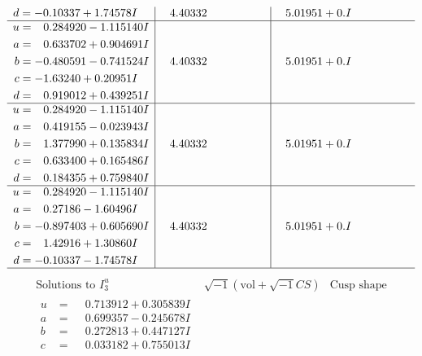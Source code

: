 \documentclass[1p]{elsarticle_modified}
\theoremstyle{definition}
\newcommand{\I}{\sqrt{-1}}
\begin{document}
$$\begin{array}{c|c|c}
\begin{aligned}
d &= -0.10337 + 1.74578 I\end{aligned}
 & \phantom{-}4.40332\phantom{ +0.000000I} & \phantom{-}5.01951 + 0. I\phantom{ +0.000000I} \\ \hline\begin{aligned}
u &= \phantom{-}0.284920 - 1.115140 I \\
a &= \phantom{-}0.633702 + 0.904691 I \\
b &= -0.480591 - 0.741524 I \\
c &= -1.63240 + 0.20951 I \\
d &= \phantom{-}0.919012 + 0.439251 I\end{aligned}
 & \phantom{-}4.40332\phantom{ +0.000000I} & \phantom{-}5.01951 + 0. I\phantom{ +0.000000I} \\ \hline\begin{aligned}
u &= \phantom{-}0.284920 - 1.115140 I \\
a &= \phantom{-}0.419155 - 0.023943 I \\
b &= \phantom{-}1.377990 + 0.135834 I \\
c &= \phantom{-}0.633400 + 0.165486 I \\
d &= \phantom{-}0.184355 + 0.759840 I\end{aligned}
 & \phantom{-}4.40332\phantom{ +0.000000I} & \phantom{-}5.01951 + 0. I\phantom{ +0.000000I} \\ \hline\begin{aligned}
u &= \phantom{-}0.284920 - 1.115140 I \\
a &= \phantom{-}0.27186 - 1.60496 I \\
b &= -0.897403 + 0.605690 I \\
c &= \phantom{-}1.42916 + 1.30860 I \\
d &= -0.10337 - 1.74578 I\end{aligned}
 & \phantom{-}4.40332\phantom{ +0.000000I} & \phantom{-}5.01951 + 0. I\phantom{ +0.000000I}\\
 \hline 
 \end{array}$$\newpage$$\begin{array}{c|c|c}  
\text{Solutions to }I^u_{3}& \I (\text{vol} + \sqrt{-1}CS) & \text{Cusp shape}\\
 \hline 
\begin{aligned}
u &= \phantom{-}0.713912 + 0.305839 I \\
a &= \phantom{-}0.699357 - 0.245678 I \\
b &= \phantom{-}0.272813 + 0.447127 I \\
c &= \phantom{-}0.033182 + 0.755013 I \\

\end{aligned}
\end{array}$$
\end{document}
